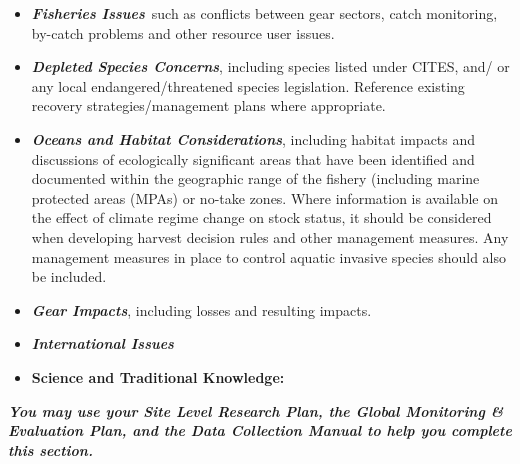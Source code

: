 \documentclass[]{book}
\providecommand{\tightlist}{%
  \setlength{\itemsep}{0pt}\setlength{\parskip}{0pt}}
\begin{document}
\begin{itemize}
  \begin{itemize}
  \item
    \textbf{\emph{Fisheries Issues}}~such as conflicts between gear
    sectors, catch monitoring, by-catch problems and other resource user
    issues.
  \item
    \textbf{\emph{Depleted Species Concerns}}, including species listed
    under CITES, and/ or any local endangered/threatened species
    legislation. Reference existing recovery strategies/management plans
    where appropriate.
  \item
    \textbf{\emph{Oceans and Habitat Considerations}}, including habitat
    impacts and discussions of ecologically significant areas that have
    been identified and documented within the geographic range of the
    fishery (including marine protected areas (MPAs) or no-take zones.
    Where information is available on the effect of climate regime
    change on stock status, it should be considered when developing
    harvest decision rules and other management measures. Any management
    measures in place to control aquatic invasive species should also be
    included.
  \item
    \textbf{\emph{Gear Impacts}}, including losses and resulting
    impacts.
  \item
    \textbf{\emph{International Issues}}
  \end{itemize}
\end{itemize}

\begin{itemize}
\tightlist
\item
  \textbf{Science and Traditional Knowledge:}
\end{itemize}

\textbf{\emph{You may use your Site Level Research Plan, the Global
Monitoring \& Evaluation Plan, and the Data Collection Manual to help
you complete this section.}}
\end{document}
